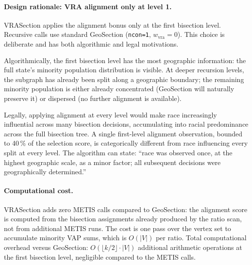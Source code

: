 \paragraph{Design rationale: VRA alignment only at level 1.}
VRASection applies the alignment bonus only at the first bisection level.
Recursive calls use standard GeoSection (\texttt{ncon=1}, $w_\text{vra}=0$).
This choice is deliberate and has both algorithmic and legal motivations.

Algorithmically, the first bisection level has the most geographic information:
the full state's minority population distribution is visible.
At deeper recursion levels, the subgraph has already been split along a
geographic boundary; the remaining minority population is either already
concentrated (GeoSection will naturally preserve it) or dispersed (no
further alignment is available).

Legally, applying alignment at every level would make race increasingly
influential across many bisection decisions, accumulating into racial
predominance across the full bisection tree.
A single first-level alignment observation, bounded to 40\,\% of the
selection score, is categorically different from race influencing every
split at every level.
The algorithm can state: ``race was observed once, at the highest geographic
scale, as a minor factor; all subsequent decisions were geographically
determined.''

\paragraph{Computational cost.}
VRASection adds zero METIS calls compared to GeoSection: the alignment
score is computed from the bisection assignments already produced by the
ratio scan, not from additional METIS runs.
The cost is one pass over the vertex set to accumulate minority VAP
sums, which is $O(|V|)$ per ratio.
Total computational overhead versus GeoSection:
$O(\lfloor k/2 \rfloor \cdot |V|)$ additional arithmetic operations
at the first bisection level, negligible compared to the METIS calls.
